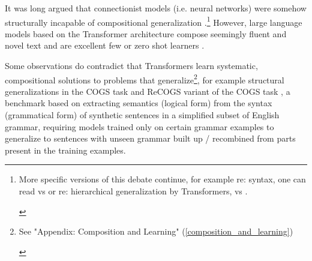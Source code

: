 \documentclass[11pt]{article}
\begin{document}
It was long argued that connectionist models (i.e. neural networks) were somehow structurally incapable of compositional generalization \cite{FodorPylyshyn1988}.\footnote{\begin{footnotesize}
More specific versions of this debate continue, for example re: syntax, one can read \cite{vanschijndel2019quantitydoesntbuyquality} vs \cite{goldberg2019assessingbertssyntacticabilities} or re: hierarchical generalization by Transformers, \cite{petty2021transformersgeneralizelinearly} vs \cite{murty2023grokkinghierarchicalstructurevanilla}.\end{footnotesize}} 
However, large language models based on the Transformer architecture \cite{vaswani2017attention} compose seemingly fluent and novel text and are excellent few or zero shot learners \cite{Brown2020}.

Some observations do contradict that Transformers learn systematic, compositional solutions to problems that generalize\footnote{\begin{footnotesize}See "Appendix: Composition and Learning" (\ref{composition_and_learning})\end{footnotesize}}, for example structural generalizations
in the COGS task and ReCOGS\cite{Wu2023} variant of the COGS task \cite{KimLinzen2020}
, a benchmark based on extracting semantics (logical form) from the syntax (grammatical form) of synthetic sentences in a simplified subset of English grammar, requiring models trained only on certain grammar examples to generalize to sentences with unseen grammar built up / recombined from parts present in the training examples.
\end{document}
